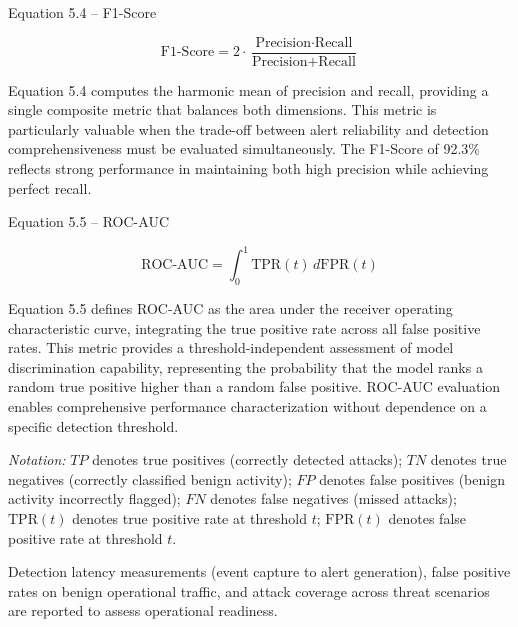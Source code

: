 \vspace{0.15cm}

\noindent
Equation 5.4 -- F1-Score

\begin{equation}
\text{F1-Score} = 2 \cdot \frac{\text{Precision} \cdot \text{Recall}}{\text{Precision} + \text{Recall}}
\label{eq:f1score}
\end{equation}

Equation 5.4 computes the harmonic mean of precision and recall, providing a single composite metric that balances both dimensions. This metric is particularly valuable when the trade-off between alert reliability and detection comprehensiveness must be evaluated simultaneously. The F1-Score of 92.3\% reflects strong performance in maintaining both high precision while achieving perfect recall.

\vspace{0.15cm}

\noindent
Equation 5.5 -- ROC-AUC

\begin{equation}
\text{ROC-AUC} = \int_0^1 \text{TPR}(t) \, d\text{FPR}(t)
\label{eq:rocauc}
\end{equation}

Equation 5.5 defines ROC-AUC as the area under the receiver operating characteristic curve, integrating the true positive rate across all false positive rates. This metric provides a threshold-independent assessment of model discrimination capability, representing the probability that the model ranks a random true positive higher than a random false positive. ROC-AUC evaluation enables comprehensive performance characterization without dependence on a specific detection threshold.

\vspace{0.2cm}

\noindent
\textit{Notation:} $TP$ denotes true positives (correctly detected attacks); $TN$ denotes true negatives (correctly classified benign activity); $FP$ denotes false positives (benign activity incorrectly flagged); $FN$ denotes false negatives (missed attacks); $\text{TPR}(t)$ denotes true positive rate at threshold $t$; $\text{FPR}(t)$ denotes false positive rate at threshold $t$.

\vspace{0.2cm}

\noindent Detection latency measurements (event capture to alert generation), false positive rates on benign operational traffic, and attack coverage across threat scenarios are reported to assess operational readiness.

